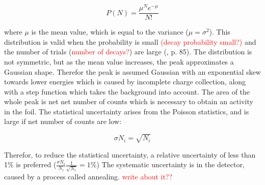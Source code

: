 \begin{equation}
    P(N)=\frac{\mu^N e^{-\mu}}{N!}
\end{equation}

where $\mu$ is the mean value, which is equal to the variance ($\mu=\sigma^2$). This distribution is valid when the probability is small \textcolor{red}{(decay probability small?)} and the number of trials (\textcolor{red}{number of decays?}) are large (\cite{Leo1994}, p. 85).  The distribution is not symmetric, but as the mean value increases, the peak approximates a Gaussian shape. Therefor the peak is assumed Gaussian with an exponential skew towards lower energies which is caused by incomplete charge collection, along with a step function which takes the background into account. The area of the whole peak is net net number of counts which is necessary to obtain an activity in the foil. The statistical uncertainty arises from the Poisson statistics, and is large if net number of counts are low:

\begin{equation}
    \sigma N_i = \sqrt{N_i}
\end{equation}

Therefor, to reduce the statistical uncertainty, a relative uncertainty of less than 1\% is preferred ($\frac{\sigma N_i}{N_i}\frac{1}{\sqrt{N_i}}=1\%$) 
The systematic uncertainty is in the detector, caused by a process called annealing. \textcolor{red}{write about it??}


